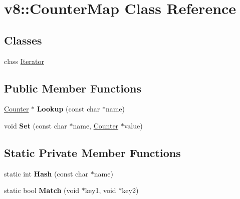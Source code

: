 \hypertarget{classv8_1_1_counter_map}{}\section{v8\+:\+:Counter\+Map Class Reference}
\label{classv8_1_1_counter_map}
\subsection*{Classes}
\begin{DoxyCompactItemize}
\item 
class \hyperlink{classv8_1_1_counter_map_1_1_iterator}{Iterator}
\end{DoxyCompactItemize}
\subsection*{Public Member Functions}
\begin{DoxyCompactItemize}
\item 
\hyperlink{classv8_1_1_counter}{Counter} $\ast$ {\bfseries Lookup} (const char $\ast$name)\hypertarget{classv8_1_1_counter_map_a9f591297e34d28b0e0e8f19e0629cc70}{}\label{classv8_1_1_counter_map_a9f591297e34d28b0e0e8f19e0629cc70}

\item 
void {\bfseries Set} (const char $\ast$name, \hyperlink{classv8_1_1_counter}{Counter} $\ast$value)\hypertarget{classv8_1_1_counter_map_a9a16f9691b16fd40e6fa6b1d5f3cf799}{}\label{classv8_1_1_counter_map_a9a16f9691b16fd40e6fa6b1d5f3cf799}

\end{DoxyCompactItemize}
\subsection*{Static Private Member Functions}
\begin{DoxyCompactItemize}
\item 
static int {\bfseries Hash} (const char $\ast$name)\hypertarget{classv8_1_1_counter_map_a17d87274d33021da36442cc6c16d0dbc}{}\label{classv8_1_1_counter_map_a17d87274d33021da36442cc6c16d0dbc}

\item 
static bool {\bfseries Match} (void $\ast$key1, void $\ast$key2)\hypertarget{classv8_1_1_counter_map_a63d689e8aecd58094ae7587559c4cc05}{}\label{classv8_1_1_counter_map_a63d689e8aecd58094ae7587559c4cc05}

\end{DoxyCompactItemize}
